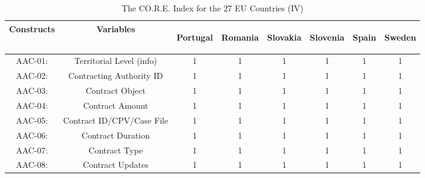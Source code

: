 \documentclass[a4paper, twoside]{report}
\begin{document}
\begin{table}[htbp]
  \centering
  \caption{The CO.R.E. Index for the 27 EU Countries (IV)}
   \tabcolsep=0.80cm
	\renewcommand{\arraystretch}{0.9}
	\begin{adjustbox}{max width=\linewidth}
         \begin{tabular}{rccccccc}
    \multicolumn{1}{c}{Constructs} & Variables & \multicolumn{1}{l}{\begin{sideways}Portugal\end{sideways}} & \multicolumn{1}{l}{\begin{sideways}Romania\end{sideways}} & \multicolumn{1}{l}{\begin{sideways}Slovakia\end{sideways}} & \multicolumn{1}{l}{\begin{sideways}Slovenia\end{sideways}} & \multicolumn{1}{l}{\begin{sideways}Spain\end{sideways}} & \multicolumn{1}{l}{\begin{sideways}Sweden\end{sideways}} \\
    \midrule
    \multicolumn{1}{c}{AAC-01:} & \multicolumn{1}{p{19em}}{Territorial Level (info)} & 1     & 1     & 1     & 1     & 1     & 1 \\
    \multicolumn{1}{c}{AAC-02:} & \multicolumn{1}{p{19em}}{Contracting Authority ID} & 1     & 1     & 1     & 1     & 1     & 1 \\
    \multicolumn{1}{c}{AAC-03:} & \multicolumn{1}{p{19em}}{Contract Object} & 1     & 1     & 1     & 1     & 1     & 1 \\
    \multicolumn{1}{c}{AAC-04:} & \multicolumn{1}{p{19em}}{Contract Amount} & 1     & 1     & 1     & 1     & 1     & 1 \\
    \multicolumn{1}{c}{AAC-05:} & \multicolumn{1}{p{19em}}{Contract ID/CPV/Case File} & 1     & 1     & 1     & 1     & 1     & 1 \\
    \multicolumn{1}{c}{AAC-06:} & \multicolumn{1}{p{19em}}{Contract Duration} & 1     & 1     & 1     & 1     & 1     & 1 \\
    \multicolumn{1}{c}{AAC-07:} & \multicolumn{1}{p{19em}}{Contract Type} & 1     & 1     & 1     & 1     & 1     & 1 \\
    \multicolumn{1}{c}{AAC-08:} & \multicolumn{1}{p{19em}}{Contract Updates} & 1     & 1     & 1     & 1     & 1     & 1 \\

\end{tabular}
\end{adjustbox}
\end{table}
\end{document}
